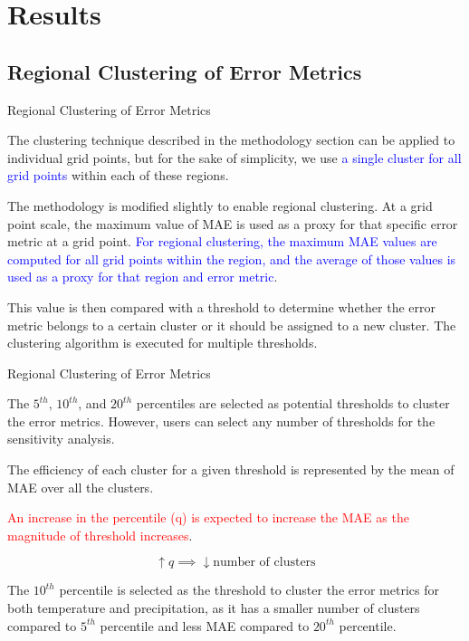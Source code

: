 \documentclass[xcolor={dvipsnames}]{beamer}
\begin{document}
\section{Results}

\subsection{Regional Clustering of Error Metrics}

\begin{frame}{Regional Clustering of Error Metrics}

The clustering technique described in the methodology section can be applied to individual grid points, but for the sake of simplicity, we use \textcolor{blue}{a single cluster for all grid points} within each of these regions.

\hfill

The methodology is modified slightly to enable regional clustering. At a grid point scale, the maximum value of MAE is used as a proxy for that specific error metric at a grid point. \textcolor{blue}{For regional clustering, the maximum MAE values are computed for all grid points within the region, and the average of those values is used as a proxy for that region and error metric}.

\hfill

This value is then compared with a threshold to determine whether the error metric belongs to a certain cluster or it should be assigned to a new cluster. The clustering algorithm is executed for  multiple thresholds.
\end{frame}

\begin{frame}{Regional Clustering of Error Metrics}

The $5^{th}$, $10^{th}$, and $20^{th}$ percentiles are selected as potential thresholds to cluster the error metrics. However, users can select any number of thresholds for the sensitivity analysis.

\hfill

The efficiency of each cluster for a given threshold is represented by the mean of MAE over all the clusters.

\hfill

\textcolor{red}{An increase in the percentile (q) is expected to increase the MAE as the magnitude of threshold increases}.

\hfill

\[ \uparrow q \implies  \downarrow \text{number of clusters} \]

The $10^{th}$ percentile is selected as the threshold to cluster the error metrics for both temperature and precipitation, as it has a smaller number of clusters compared to $5^{th}$ percentile and less MAE compared to $20^{th}$ percentile.

\end{frame}
\end{document}
